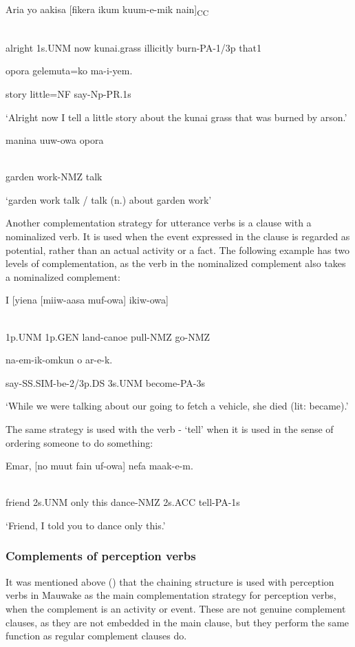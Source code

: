 \ea%
\label{ex:x1594}
\gll Aria  yo  aakisa  [fikera  ikum  kuum-e-mik  nain]\textsubscript{CC} \\
      \\
\glt
\z

alright  1s.UNM  now  kunai.grass  illicitly  burn-PA-1/3p  that1

opora  gelemuta=ko  ma-i-yem.

story  little=NF  say-Np-PR.1s

`Alright now I tell a little story about the kunai grass that was burned by arson.'

\ea%
\label{ex:x1598}
\gll manina  uuw-owa  opora \\
      \\
\glt
\z

garden  work-NMZ  talk

`garden work talk / talk (n.) about garden work'

Another complementation strategy for utterance verbs is a clause with a nominalized verb. It is used when the event expressed in the clause is regarded as potential, rather than an actual activity or a fact. The following example has two levels of complementation, as the verb in the nominalized complement also takes a nominalized complement:

\ea%
\label{ex:x1599}
\gll I  [yiena  [miiw-aasa  muf-owa]  ikiw-owa]  \\
      \\
\glt
\z

1p.UNM  1p.GEN  land-canoe  pull-NMZ  go-NMZ  

na-em-ik-omkun  o  ar-e-k.

say-SS.SIM-be-2/3p.DS  3s.UNM  become-PA-3s

`While we were talking about our going to fetch a vehicle, she died (lit: became).'

The same strategy is used with the verb - `tell' when it is used in the sense of ordering someone to do something: 

\ea%
\label{ex:x1630}
\gll Emar,  [no  muut  fain  uf-owa]  nefa  maak-e-m. \\
      \\
\glt
\z

friend  2s.UNM  only  this  dance-NMZ  2s.ACC  tell-PA-1s

`Friend, I told you to dance only this.'

\subsubsection[Complements of perception verbs]{Complements of perception verbs}
\hypertarget{RefHeading23561935131865}{}
It was mentioned above () that the chaining structure is used with perception verbs in Mauwake as the main complementation strategy for perception verbs, when the complement is an activity or event. These are not genuine complement clauses, as they are not embedded in the main clause, but they perform the same function as regular complement clauses do. 

